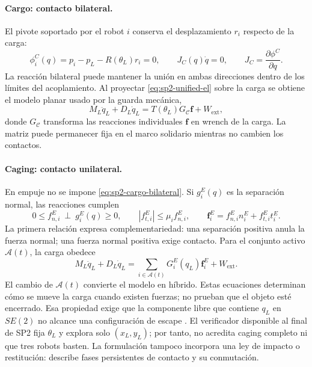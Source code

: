 \documentclass[12pt,a4paper]{article}
\begin{document}
\paragraph{Cargo: contacto bilateral.}
El pivote soportado por el robot $i$ conserva el desplazamiento $r_i$ respecto
de la carga:
\begin{equation}
\phi_i^{C}(q)=p_i-p_L-R(\theta_L)r_i=0,
\qquad J_C(q)\dot q=0,
\qquad J_C=\frac{\partial\phi^{C}}{\partial q}.
\label{eq:sp2-cargo-bilateral}
\end{equation}
La reacción bilateral puede mantener la unión en ambas direcciones dentro de
los límites del acoplamiento. Al proyectar \eqref{eq:sp2-unified-el} sobre la
carga se obtiene el modelo planar usado por la guarda mecánica,
\begin{equation}
M_L\ddot q_L+D_L\dot q_L
=T(\theta_L)G_{\mathcal C}\mathbf f+W_{\mathrm{ext}},
\label{eq:sp2-payload-el}
\end{equation}
donde $G_{\mathcal C}$ transforma las reacciones individuales $\mathbf f$ en
wrench de la carga. La matriz puede permanecer fija en el marco solidario
mientras no cambien los contactos.

\paragraph{Caging: contacto unilateral.}
En empuje no se impone \eqref{eq:sp2-cargo-bilateral}. Si $g_i^{E}(q)$ es la
separación normal, las reacciones cumplen
\begin{equation}
0\leq f_{n,i}^{E}\ \perp\ g_i^{E}(q)\geq0,
\qquad |f_{t,i}^{E}|\leq\mu_i f_{n,i}^{E},
\qquad
\mathbf f_i^{E}=f_{n,i}^{E}n_i^{E}+f_{t,i}^{E}t_i^{E}.
\label{eq:sp2-caging-complementarity}
\end{equation}
La primera relación expresa complementariedad: una separación positiva anula
la fuerza normal; una fuerza normal positiva exige contacto. Para el conjunto
activo $\mathcal A(t)$, la carga obedece
\begin{equation}
M_L\ddot q_L+D_L\dot q_L
=\sum_{i\in\mathcal A(t)}G_i^{E}(q_L)\mathbf f_i^{E}+W_{\mathrm{ext}}.
\label{eq:sp2-caging-el}
\end{equation}
El cambio de $\mathcal A(t)$ convierte el modelo en híbrido. Estas ecuaciones
determinan cómo se mueve la carga cuando existen fuerzas; no prueban que el
objeto esté encerrado. Esa propiedad exige que la componente libre que contiene
$q_L$ en $SE(2)$ no alcance una configuración de escape
\parencite{bicchi1995closure,pereira2004caging}. El verificador disponible al
final de SP2 fija $\theta_L$ y explora solo $(x_L,y_L)$; por tanto, no acredita
caging completo ni que tres robots basten. La formulación tampoco incorpora una
ley de impacto o restitución: describe fases persistentes de contacto y su
conmutación.
\end{document}
